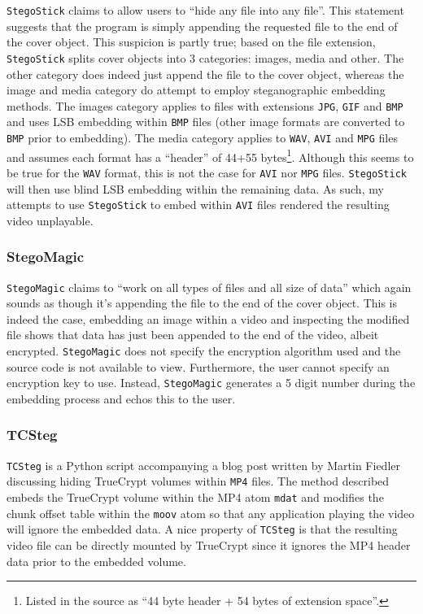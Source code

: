 \documentclass[paper=a4, fontsize=11pt,twoside]{scrartcl}    %
\numberwithin{table}{section}
\numberwithin{figure}{section}
\numberwithin{algorithm}{section}
\begin{document}
\texttt{StegoStick} claims to allow users to ``hide any file into any file''. This statement suggests that the program is simply appending the requested file to the end of the cover object. This suspicion is partly true; based on the file extension, \texttt{StegoStick} splits cover objects into 3 categories: images, media and other. The other category does indeed just append the file to the cover object, whereas the image and media category do attempt to employ steganographic embedding methods. The images category applies to files with extensions \texttt{JPG}, \texttt{GIF} and \texttt{BMP} and uses LSB embedding within \texttt{BMP} files (other image formats are converted to \texttt{BMP} prior to embedding). The media category applies to \texttt{WAV}, \texttt{AVI} and \texttt{MPG} files and assumes each format has a ``header'' of 44+55 bytes\footnote{Listed in the source as ``44 byte header + 54 bytes of extension space''.}. Although this seems to be true for the \texttt{WAV} format, this is not the case for \texttt{AVI} nor \texttt{MPG} files. \texttt{StegoStick} will then use blind LSB embedding within the remaining data. As such, my attempts to use \texttt{StegoStick} to embed within \texttt{AVI} files rendered the resulting video unplayable. %

\subsubsection{StegoMagic}

\texttt{StegoMagic} claims to ``work on all types of files and all size of data'' which again sounds as though it's appending the file to the end of the cover object. This is indeed the case, embedding an image within a video and inspecting the modified file shows that data has just been appended to the end of the video, albeit encrypted. \texttt{StegoMagic} does not specify the encryption algorithm used and the source code is not available to view. Furthermore, the user cannot specify an encryption key to use. Instead, \texttt{StegoMagic} generates a 5 digit number during the embedding process and echos this to the user.  

\subsubsection{TCSteg}

\texttt{TCSteg} is a Python script accompanying a blog post written by Martin Fiedler discussing hiding TrueCrypt volumes within \texttt{MP4} files. The method described embeds the TrueCrypt volume within the MP4 atom \texttt{mdat} and modifies the chunk offset table within the \texttt{moov} atom so that any application playing the video will ignore the embedded data. A nice property of \texttt{TCSteg} is that the resulting video file can be directly mounted by TrueCrypt since it ignores the MP4 header data prior to the embedded volume.\\
\end{document}
